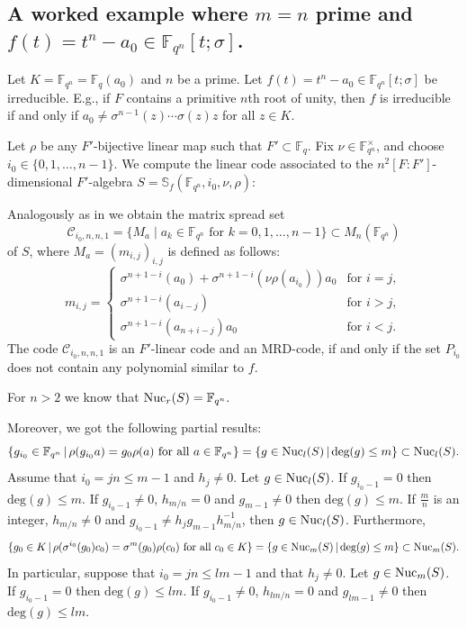 \documentclass[12pt]{amsart}
\theoremstyle{plain}
\theoremstyle{definition}
\numberwithin{equation}{section}
\numberwithin{figure}{section}
\begin{document}
\subsection{A worked example where $m=n$ prime and $f(t)=t^n-a_0\in \mathbb{F}_{q^n}[t;\sigma]$.}
Let $K=\mathbb{F}_{q^n}=\mathbb{F}_{q}(a_0)$ and $n$ be a prime. Let $f(t)=t^n-a_0\in \mathbb{F}_{q^n}[t;\sigma]$ be irreducible.
E.g., if $F$ contains a primitive $n$th root of unity, then $f$ is irreducible if and only if $a_0 \not=\sigma^{n-1}(z)\cdots\sigma(z)z$ for all $z\in K$.

Let $\rho$ be any $F'$-bijective linear map such that $F'\subset \mathbb{F}_{q}$. Fix $\nu \in \mathbb{F}_{q^n}^\times$, and choose  $i_0\in \{0,1,\dots, n-1\}$.
We compute the linear code associated to the $n^2[F:F']$-dimensional  $F'$-algebra  $S=\mathbb{S}_f(\mathbb{F}_{q^n},i_0,\nu,\rho)$:

Analogously as in \cite[Section 8]{PT2} we obtain the matrix spread set
$$\mathcal{C}_{i_0, n,n,1}=\lbrace M_a\mid a_k\in \mathbb{F}_{q^n} \mbox{ for } k=0,1,\dots,n-1\rbrace\subset M_n(\mathbb{F}_{q^n})$$
of  $S$, where
$M_a=(m_{i,j})_{i,j}$ is defined as follows:
\begin{equation*}
 m_{i,j}=
\begin{cases}
\sigma^{n+1-i}(a_0)+\sigma^{n+1-i}(\nu\rho(a_{i_0}))a_0&\mbox{for } i=j,\\
\sigma^{n+1-i}(a_{i-j}) &\mbox{for } i>j,\\
\sigma^{n+1-i}(a_{n+i-j})a_0&\mbox{for } i<j.
\end{cases}
\end{equation*}
The code $\mathcal{C}_{i_0, n,n,1}$ is an $F'$-linear code and an MRD-code, if and only if the set $ P_{i_0} $ does not contain any polynomial similar to $f$.




 For $n>2$  we know that ${\rm Nuc}_r(S)=\mathbb{F}_{q^n}.$

 Moreover, we got the following partial results:
  $$\{g_{i_0}\in \mathbb{F}_{q^n} \,|\, \rho(g_{i_0} a) = g_0\rho(a)  \text{ for all } a\in \mathbb{F}_{q^n}\} =\{g\in {\rm Nuc}_l(S)\,|\, \text{deg}(g)\leq m \}\subset {\rm Nuc}_l(S).$$
Assume that $i_0=jn \leq m-1$ and  $h_j\not=0$. Let $g \in {\rm Nuc}_l(S)$.
If $g_{i_0-1}=0$ then $\text{deg}(g)\leq m$.
 If $g_{i_0-1}\not=0$, $h_{m/n} =0$  and  $g_{m-1}\not=0 $
then $\text{deg}(g)\leq m$.  If $\frac{m}{n}$ is  an integer, $h_{m/n}\not =0$ and $ g_{i_0-1}\not =h_j g_{m-1}h_{m/n}^{-1}$,
then $g \in  {\rm Nuc}_l(S)$. Furthermore,
$$  \lbrace g_0\in K \,|\, \rho(\sigma^{i_0}(g_0) c_0) = \sigma^{m}(g_0)\rho(c_0) \text{ for all } c_0\in K\rbrace =
\{ g\in {\rm Nuc}_m(S) \,|\, \text{deg}(g)\leq m\}\subset {\rm Nuc}_m(S).$$
In particular, suppose that $i_0=jn \leq lm-1$ and  that $h_j\not=0$. Let $g \in {\rm Nuc}_m(S)$.
If $g_{i_0-1}=0$ then $\text{deg}(g)\leq lm$.  If $g_{i_0-1}\not=0$, $h_{lm/n} =0$  and  $g_{lm-1}\not=0 $
then $\text{deg}(g)\leq lm$.
\end{document}
